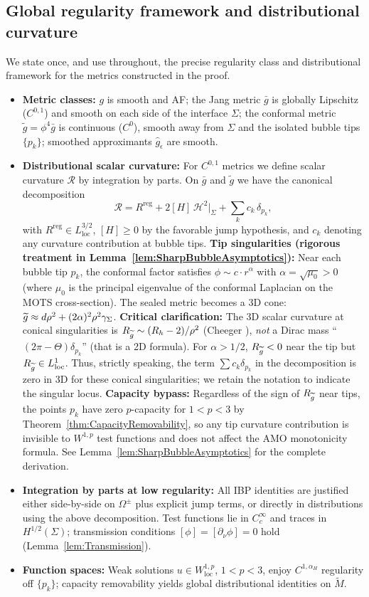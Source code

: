 \subsection{Global regularity framework and distributional curvature}\label{sec:RegularityFramework}
We state once, and use throughout, the precise regularity class and distributional framework for the metrics constructed in the proof.
\begin{itemize}
    \item \textbf{Metric classes:} $g$ is smooth and AF; the Jang metric $\bar g$ is globally Lipschitz ($C^{0,1}$) and smooth on each side of the interface $\Sigma$; the conformal metric $\tilde g=\phi^4\bar g$ is continuous ($C^0$), smooth away from $\Sigma$ and the isolated bubble tips $\{p_k\}$; smoothed approximants $\hat g_\epsilon$ are smooth.
    \item \textbf{Distributional scalar curvature:} For $C^{0,1}$ metrics we define scalar curvature $\mathcal{R}$ by integration by parts. On $\bar g$ and $\tilde g$ we have the canonical decomposition
    \[
        \mathcal{R}=R^{\mathrm{reg}}+2[H]\,\mathcal{H}^{2}|_{\Sigma}+\sum_k c_k\,\delta_{p_k},
    \]
    with $R^{\mathrm{reg}}\in L^{3/2}_{\mathrm{loc}}$, $[H] \ge 0$ by the favorable jump hypothesis, and $c_k$ denoting any curvature contribution at bubble tips. \textbf{Tip singularities (rigorous treatment in Lemma~\ref{lem:SharpBubbleAsymptotics}):} Near each bubble tip $p_k$, the conformal factor satisfies $\phi \sim c \cdot r^{\alpha}$ with $\alpha = \sqrt{\mu_0} > 0$ (where $\mu_0$ is the principal eigenvalue of the conformal Laplacian on the MOTS cross-section). The sealed metric becomes a 3D cone: $\widetilde{g} \approx d\rho^2 + (2\alpha)^2 \rho^2 \gamma_\Sigma$. \textbf{Critical clarification:} The 3D scalar curvature at conical singularities is $R_{\widetilde{g}} \sim (R_h - 2)/\rho^2$ (Cheeger \cite{cheeger1983}), \emph{not} a Dirac mass ``$(2\pi - \Theta)\delta_{p_k}$'' (that is a 2D formula). For $\alpha > 1/2$, $R_{\widetilde{g}} < 0$ near the tip but $R_{\widetilde{g}} \in L^1_{\text{loc}}$. Thus, strictly speaking, the term $\sum c_k \delta_{p_k}$ in the decomposition is zero in 3D for these conical singularities; we retain the notation to indicate the singular locus. \textbf{Capacity bypass:} Regardless of the sign of $R_{\widetilde{g}}$ near tips, the points $p_k$ have zero $p$-capacity for $1<p<3$ by Theorem~\ref{thm:CapacityRemovability}, so any tip curvature contribution is invisible to $W^{1,p}$ test functions and does not affect the AMO monotonicity formula. See Lemma~\ref{lem:SharpBubbleAsymptotics} for the complete derivation.
    \item \textbf{Integration by parts at low regularity:} All IBP identities are justified either side-by-side on $\Omega^{\pm}$ plus explicit jump terms, or directly in distributions using the above decomposition. Test functions lie in $C^{\infty}_c$ and traces in $H^{1/2}(\Sigma)$; transmission conditions $[\phi]=[\partial_\nu\phi]=0$ hold (Lemma~\ref{lem:Transmission}).
    \item \textbf{Function spaces:} Weak solutions $u\in W^{1,p}_{\mathrm{loc}}$, $1<p<3$, enjoy $C^{1,\alpha_H}$ regularity off $\{p_k\}$; capacity removability yields global distributional identities on $\tilde M$.
\end{itemize}
